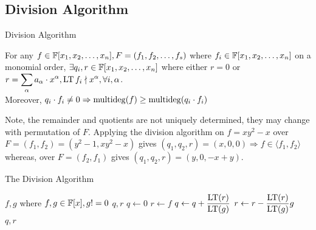 \documentclass[aspectratio=169, handout, 10pt, hyperref=colorlinks]{beamer}
\begin{document}
\subsection{Division Algorithm}
\begin{frame}[allowframebreaks]{Division Algorithm}
    \begin{theorem}
    For any $f\in\mathbb{F}[x_1, x_2, \ldots, x_n],  F=(f_1,f_2,\ldots,f_s)$  where $f_i \in\mathbb{F}[x_1, x_2, \ldots, x_n]$ on a monomial order, $\exists q_i, r\in\mathbb{F}[x_1, x_2, \ldots, x_n]$ where either $r=0$ or $r=\displaystyle\sum_{\alpha}a_\alpha\cdot x^\alpha, \operatorname{LT}{f_i} \nmid x^\alpha, \forall i, \alpha$.\\
    Moreover, $q_i \cdot f_i\neq 0 \Rightarrow \operatorname{multideg}(f)\geq\operatorname{multideg}(q_i\cdot f_i)$
\end{theorem}
    Note, the remainder and quotients are not uniquely determined, they may change with permutation of $F$. Applying the division algorithm on $f=xy^2-x$ over $F=(f_1,f_2)=(y^2-1, xy^2-x)$ gives $(q_1,q_2,r)=(x,0,0)\Rightarrow f\in \langle f_1,f_2\rangle$ whereas, over $F=(f_2,f_1)$ gives $(q_1,q_2,r)=(y,0,-x+y)$.
\end{frame}
    \begin{frame}[allowframebreaks]{The Division Algorithm}
    \begin{center}
        \begin{algorithm}[H]
        \caption{Polynomial Division (Single Variable)\footnote{\tiny Donal O’Shea David A. Cox, John Little.
Ideals, Varieties, and Algorithms: An Introduction to Computational Algebraic Geometry and
Commutative Algebra.}}\label{alg:polynomialdivisionsingle}
        \begin{algorithmic}
        \Require $f,g$ where $f,g \in\mathbb{F}[x], g!=0$
        \Ensure $q,r$
        \State $q \gets 0$
        \State $r \gets f$
        \State $q \gets q+\dfrac{\operatorname{LT}(r)}{\operatorname{LT}(g)}$
        \State $r \gets r-\dfrac{\operatorname{LT}(r)}{\operatorname{LT}(g)}g$ %
        \EndWhile \\ 
        \Return $q,r$
        \end{algorithmic}
        \end{algorithm}
        \end{center}
        \end{frame}
\end{document}
